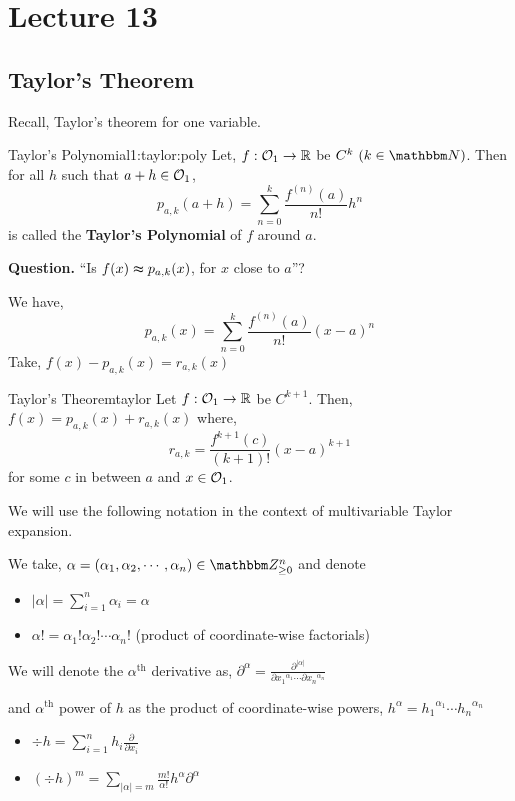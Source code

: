 \documentclass[../Analysis-3.tex]{subfiles}
\begin{document}
\chapter*{Lecture 13} %
\setcounter{chapter}{13} %
\setcounter{section}{0}

\section{Taylor's Theorem}
Recall, Taylor's theorem for one variable. 
\begin{Def}{Taylor's Polynomial}{1:taylor:poly}
  Let, $ f : \mathcal{O}_{1} \to \mathbb{R} $ be $C^k \ (k \in \N)$. Then for all $h$ such that $a+h \in \mathcal{O}_{1}$, 
  \[ p_{a,k}(a+h) = \sum_{n = 0}^{k} \frac{f^{(n)}(a)}{n!} h^{n}\]
  is called the \textbf{Taylor's Polynomial} of $f$ around $a$.
\end{Def}

\textbf{Question.} ``Is $f(x) \thickapprox  p_{a,k}(x)$, for $x$ close to $a$''?

We have,
\[  p_{a,k}(x) = \sum_{n = 0}^{k} \frac{f^{(n)}(a)}{n!} (x-a)^{n} \]
Take, $f(x) - p_{a,k}(x) = r_{a,k}(x)$

\begin{Thm}{Taylor's Theorem}{taylor}
  Let $ f: \mathcal{O}_{1} \to \mathbb{R} $ be $C^{k+1}$. Then, $f(x) = p_{a,k}(x) + r_{a,k}(x)$ where,
  \[r_{a,k} = \frac{f^{k+1}(c)}{(k+1)!} (x-a)^{k+1}\]
  for some $c$ in between $a$ and $x \in \mathcal{O}_{1}$.
\end{Thm}

We will use the following notation in the context of multivariable Taylor expansion.

\begin{notnBox}{}{}
  We take, $\alpha = (\alpha_1 , \alpha_2 , \cdots , \alpha_n) \in \Z_{\geq 0}^{n}$ and denote
  \begin{itemize}
    \item $|\alpha| = \sum_{i = 1}^{n} \alpha_i = \alpha$
    \item $\alpha ! = \alpha_1 ! \alpha_2 ! \cdots \alpha_n !$ (product of coordinate-wise factorials)
  \end{itemize}
  We will denote the $ \alpha^{\text{th}} $ derivative as, $\displaystyle\partial^{\alpha} = \frac{\partial^{|\alpha|}}{\partial {x_1}^{\alpha_1} \cdots \partial {x_n}^{\alpha_n}}$

  and $ \alpha^{\text{th}} $ power of $ h $ as the product of coordinate-wise powers, $h^{\alpha} = {h_1}^{\alpha_1} \cdots {h_n}^{\alpha_n}$
  \begin{itemize}
    \item $\displaystyle\div h = \sum_{i=1}^n h_i\frac{\partial}{\partial x_i}$
    \item $\displaystyle(\div h)^m = \sum_{| \alpha | = m } \frac{m!}{\alpha!} h^{\alpha} \partial^{\alpha}$
  \end{itemize}
\end{notnBox}
\end{document}
